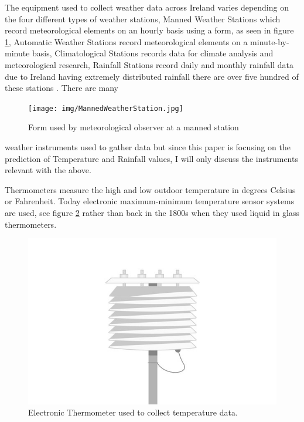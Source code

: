 The equipment used to collect weather data across Ireland varies depending on the four different types of weather stations, Manned Weather Stations which record meteorological elements on an hourly basis using a form, as seen in figure \ref{MetForm}, Automatic Weather Stations record meteorological elements on a minute-by-minute basis, Climatological Stations records data for climate analysis and meteorological research, Rainfall Stations record daily and monthly rainfall data due to Ireland having extremely distributed rainfall there are over five hundred of these stations \cite{MET}. There are many  

\begin{figure}[h]
\centering
\texttt{[image: img/MannedWeatherStation.jpg]}
\caption{Form used by meteorological observer at a manned station}
\label{MetForm}
\end{figure}
weather instruments used to gather data but since this paper is focusing on the prediction of Temperature and Rainfall values, I will only discuss the instruments relevant with the above.

Thermometers measure the high and low outdoor temperature in degrees Celsius or Fahrenheit. Today electronic maximum-minimum temperature sensor systems are used, see figure \ref{Thermometer} rather than back in the 1800s when they used liquid in glass thermometers.\cite{WeatherInstruments}

\begin{figure}[h]
\centering
\includegraphics[scale=0.2]{img/MaxMinThermometer.jpg}
\caption{Electronic Thermometer used to collect temperature data.}
\label{Thermometer}
\end{figure}

